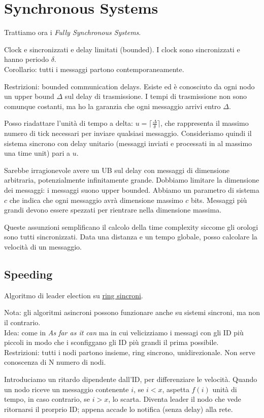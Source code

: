 \section{Synchronous Systems}
Trattiamo ora i \textit{Fully Synchronous Systems}.

Clock e sincronizzati e delay limitati (bounded).
I clock sono sincronizzati e hanno periodo $\delta$.\\
Corollario: tutti i messaggi partono contemporaneamente.

Restrizioni: bounded communication delays. Esiste ed è conosciuto da ogni nodo un upper bound $\Delta$ sul delay di trasmissione.
I tempi di trasmissione non sono comunque costanti, ma ho la garanzia che ogni messaggio arrivi entro $\Delta$.

Posso riadattare l'unità di tempo a delta: $u = \lceil \frac{\Delta}{\delta} \rceil$, che rappresenta il massimo numero di tick necessari
per inviare qualsiasi messaggio. Consideriamo quindi il sistema sincrono con delay unitario (messaggi inviati e processati in al massimo
una time unit) pari a $u$. 

Sarebbe irragionevole avere un UB sul delay con messaggi di dimensione arbitraria, potenzialmente infinitamente grande.
Dobbiamo limitare la dimensione dei messaggi: i messaggi suono upper bounded.
Abbiamo un parametro di sistema $c$ che indica che ogni messaggio avrà dimensione massimo $c$ bits.
Messaggi più grandi devono essere spezzati per rientrare nella dimensione massima. 

Queste assunzioni semplificano il calcolo della time complexity siccome gli orologi sono tutti sincronizzati.
Data una distanza e un tempo globale, posso calcolare la velocità di un messaggio.

\subsection{Speeding}
Algoritmo di leader election su \underline{ring sincroni}.

Nota: gli algoritmi asincroni possono funzionare anche su sistemi sincroni, ma non il contrario.\\
Idea: come in \textit{As far as it can} ma in cui velicizziamo i messagi con gli ID più piccoli in
modo che i sconfiggano gli ID più grandi il prima possibile.\\
Restrizioni: tutti i nodi partono insieme, ring sincrono, unidirezionale. Non serve conoscenza di N numero di nodi.

Introduciamo un ritardo dipendente dall'ID, per differenziare le velocità.
Quando un nodo riceve un messaggio contenente $i$, se $i < x$, aspetta $f(i)$ unità di tempo, in caso contrario, se $i > x$, lo scarta.
Diventa leader il nodo che vede ritornarsi il prorprio ID; appena accade lo notifica (senza delay) alla rete.

